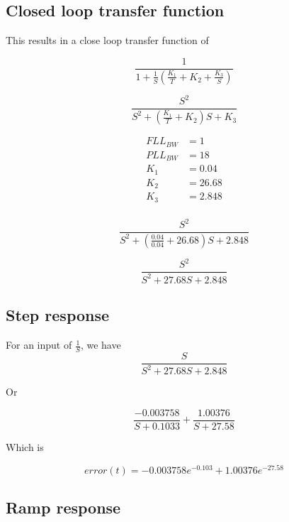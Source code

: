  
\subsection{Closed loop transfer function}
This results in a close loop transfer function of 

\begin{equation}
\frac{1}{1+\frac{1}{S} (\frac{K_1}{T} + K_2 +  \frac{K_3}{S})}
\end{equation}



\begin{equation}
\frac{S^2}{S^2 + (\frac{K_1}{T} + K_2)S + K_3}
\end{equation}

\begin{align}
FLL_{BW} &=1\\
PLL_{BW} &=18\\
K_1 &=  0.04\\
K_2 &= 26.68\\
K_3 &=  2.848\\
\end{align}


\begin{equation}
\frac{S^2}{S^2 + (\frac{0.04}{0.04} +  26.68)S + 2.848}
\end{equation}

\begin{equation}
\frac{S^2}{S^2 + 27.68 S + 2.848}
\end{equation}

\subsection{Step response}

For an input of $\frac{1}{S}$, we have 
\begin{equation}
\frac{S}{S^2 + 27.68 S + 2.848}
\end{equation}

Or 

\begin{equation}
\frac{-0.003758}{S+0.1033} + \frac{1.00376}{S+27.58}
\end{equation}

Which is

\begin{equation}
error(t) =  -0.003758 e^{-0.103} + 1.00376 e^{-27.58}
\end{equation}


\subsection{Ramp response}

